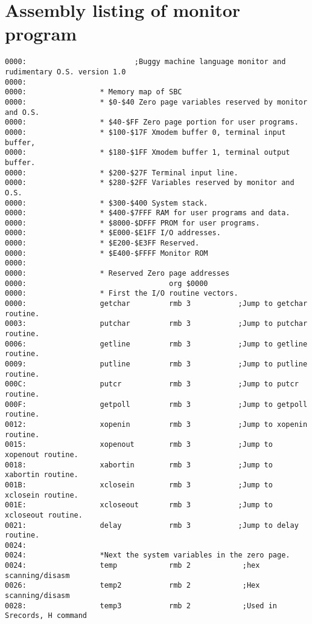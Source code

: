 \chapter{Assembly listing of monitor program}
{\footnotesize
\begin{verbatim}
0000:                         ;Buggy machine language monitor and rudimentary O.S. version 1.0
0000:                 
0000:                 * Memory map of SBC
0000:                 * $0-$40 Zero page variables reserved by monitor and O.S.
0000:                 * $40-$FF Zero page portion for user programs.
0000:                 * $100-$17F Xmodem buffer 0, terminal input buffer,
0000:                 * $180-$1FF Xmodem buffer 1, terminal output buffer.
0000:                 * $200-$27F Terminal input line.
0000:                 * $280-$2FF Variables reserved by monitor and O.S.
0000:                 * $300-$400 System stack.
0000:                 * $400-$7FFF RAM for user programs and data.
0000:                 * $8000-$DFFF PROM for user programs.
0000:                 * $E000-$E1FF I/O addresses.
0000:                 * $E200-$E3FF Reserved.
0000:                 * $E400-$FFFF Monitor ROM
0000:                 
0000:                 * Reserved Zero page addresses
0000:                                 org $0000
0000:                 * First the I/O routine vectors.
0000:                 getchar         rmb 3           ;Jump to getchar routine.
0003:                 putchar         rmb 3           ;Jump to putchar routine.
0006:                 getline         rmb 3           ;Jump to getline routine.
0009:                 putline         rmb 3           ;Jump to putline routine.
000C:                 putcr           rmb 3           ;Jump to putcr routine.
000F:                 getpoll         rmb 3           ;Jump to getpoll routine.
0012:                 xopenin         rmb 3           ;Jump to xopenin routine.
0015:                 xopenout        rmb 3           ;Jump to xopenout routine.
0018:                 xabortin        rmb 3           ;Jump to xabortin routine.
001B:                 xclosein        rmb 3           ;Jump to xclosein routine.
001E:                 xcloseout       rmb 3           ;Jump to xcloseout routine.
0021:                 delay           rmb 3           ;Jump to delay routine.
0024:                 
0024:                 *Next the system variables in the zero page.
0024:                 temp            rmb 2            ;hex scanning/disasm
0026:                 temp2           rmb 2            ;Hex scanning/disasm
0028:                 temp3           rmb 2            ;Used in Srecords, H command

\end{verbatim}}
